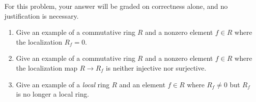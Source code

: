 \begin{question}[subtitle = January 2018 Problem 1,ID=Jan18_1]
For this problem, your answer will be graded on correctness alone, and no justification is necessary.
\begin{enumerate}
    \item Give an example of a commutative ring $R$ and a nonzero element $f \in R$ where the localization $R_f = 0$.
    \item Give an example of a commutative ring $R$ and a nonzero element $f \in R$ where the localization map $R \to R_f$ is neither injective nor surjective.
    \item Give an example of a \emph{local} ring $R$ and an element $f\in R$ where $R_f \neq 0$ but $R_f$ is no longer a local ring.
\end{enumerate}
\end{question}
